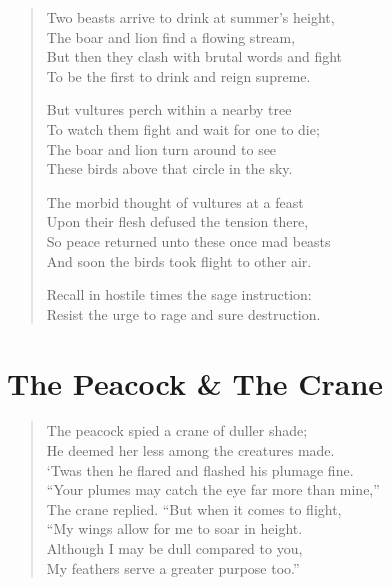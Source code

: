 \begin{verse}
Two beasts arrive to drink at summer's height, \\
The boar and lion find a flowing stream, \\
But then they clash with brutal words and fight \\
To be the first to drink and reign supreme.


But vultures perch within a nearby tree \\
To watch them fight and wait for one to die; \\
The boar and lion turn around to see \\
These birds above that circle in the sky.


The morbid thought of vultures at a feast \\
Upon their flesh defused the tension there, \\
So peace returned unto these once mad beasts \\
And soon the birds took flight to other air.


Recall in hostile times the sage instruction: \\
Resist the urge to rage and sure destruction.
\end{verse}

\newpage
\section*{The Peacock \& The Crane}

\begin{verse}
The peacock spied a crane of duller shade; \\
He deemed her less among the creatures made. \\
‘Twas then he flared and flashed his plumage fine. \\
``Your plumes may catch the eye far more than mine,'' \\
The crane replied. ``But when it comes to flight, \\
``My wings allow for me to soar in height. \\
Although I may be dull compared to you, \\
My feathers serve a greater purpose too.''
\end{verse}

